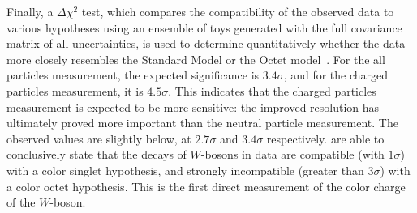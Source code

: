 \FloatBarrier

Finally, a $\Delta \chi^2$ test, which compares the compatibility of the observed data to various hypotheses using an ensemble of toys generated with the full covariance matrix of all uncertainties, is used to determine quantitatively whether the data more closely resembles the Standard Model or the Octet model~\cite{Nachman:1728288}. For the all particles measurement, the expected significance is $3.4\sigma$, and for the charged particles measurement, it is $4.5\sigma$. This indicates that the charged particles measurement is expected to be more sensitive: the improved resolution has ultimately proved more important than the neutral particle measurement. The observed values are slightly below, at $2.7\sigma$ and $3.4\sigma$ respectively. are able to conclusively state that the decays of $W$-bosons in data are compatible (with $1\sigma$) with a color singlet hypothesis, and strongly incompatible (greater than $3\sigma$) with a color octet hypothesis. This is the first direct measurement of the color charge of the $W$-boson.




